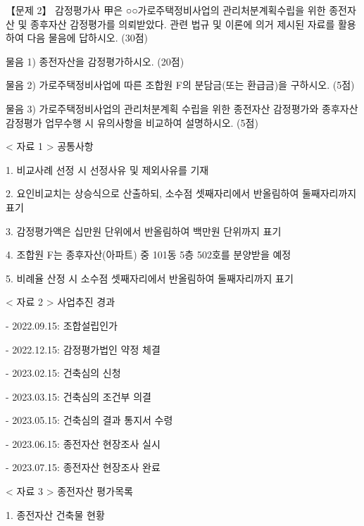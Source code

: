 \begin{longquestion}{【문제 2】}
감정평가사 甲은 ○○가로주택정비사업의 관리처분계획수립을 위한 종전자산 및 종후자산 감정평가를 의뢰받았다. 관련 법규 및 이론에 의거 제시된 자료를 활용하여 다음 물음에 답하시오. (30점) \par
\medskip\noindent 물음 1) 종전자산을 감정평가하시오. (20점) \par
\medskip\noindent 물음 2) 가로주택정비사업에 따른 조합원 F의 분담금(또는 환급금)을 구하시오. (5점) \par
\medskip\noindent 물음 3) 가로주택정비사업의 관리처분계획 수립을 위한 종전자산 감정평가와 종후자산 감정평가 업무수행 시 유의사항을 비교하여 설명하시오. (5점) \par
< 자료 1 > 공통사항 \par
1. 비교사례 선정 시 선정사유 및 제외사유를 기재 \par
2. 요인비교치는 상승식으로 산출하되, 소수점 셋째자리에서 반올림하여 둘째자리까지 표기 \par
3. 감정평가액은 십만원 단위에서 반올림하여 백만원 단위까지 표기 \par
4. 조합원 F는 종후자산(아파트) 중 101동 5층 502호를 분양받을 예정 \par
5. 비례율 산정 시 소수점 셋째자리에서 반올림하여 둘째자리까지 표기 \par
< 자료 2 > 사업추진 경과 \par
- 2022.09.15: 조합설립인가 \par
- 2022.12.15: 감정평가법인 약정 체결 \par
- 2023.02.15: 건축심의 신청 \par
- 2023.03.15: 건축심의 조건부 의결 \par
- 2023.05.15: 건축심의 결과 통지서 수령 \par
- 2023.06.15: 종전자산 현장조사 실시 \par
- 2023.07.15: 종전자산 현장조사 완료 \par
< 자료 3 > 종전자산 평가목록 \par
1. 종전자산 건축물 현황 \par
{\small\centering
{}}
\end{longquestion}
